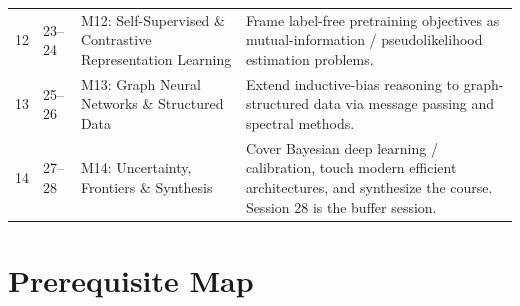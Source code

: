 \documentclass[11pt]{article}
\begin{document}
\begin{longtable}{@{}p{0.9cm}p{2.6cm}p{4.3cm}p{7.4cm}@{}}
12 & 23--24 & M12: Self-Supervised \& Contrastive Representation Learning & Frame label-free pretraining objectives as mutual-information / pseudolikelihood estimation problems. \\
13 & 25--26 & M13: Graph Neural Networks \& Structured Data & Extend inductive-bias reasoning to graph-structured data via message passing and spectral methods. \\
14 & 27--28 & M14: Uncertainty, Frontiers \& Synthesis & Cover Bayesian deep learning / calibration, touch modern efficient architectures, and synthesize the course. Session 28 is the buffer session. \\
\bottomrule
\end{longtable}

\section{Prerequisite Map}
\end{document}
